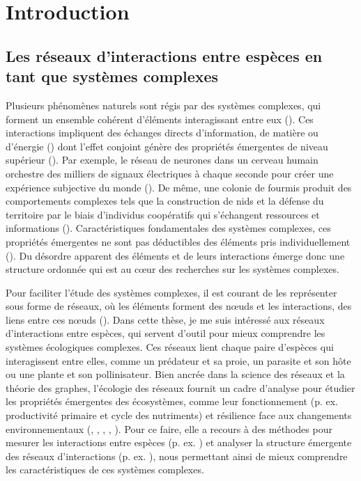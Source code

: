 
\francais   
\doublespacing
\chapter*{Introduction}



\section{Les réseaux d'interactions entre espèces en tant que systèmes complexes}

Plusieurs phénomènes naturels sont régis par des systèmes complexes, qui forment
un ensemble cohérent d'éléments interagissant entre eux
(\cite{Rind1999Complexity}). Ces interactions impliquent des échanges directs
d'information, de matière ou d'énergie (\cite{Ladyman2013What}) dont l'effet
conjoint génère des propriétés émergentes de niveau supérieur
(\cite{Foote2007Mathematics}). Par exemple, le réseau de neurones dans un
cerveau humain orchestre des milliers de signaux électriques à chaque seconde
pour créer une expérience subjective du monde (\cite{Sporns2011Human}). De même,
une colonie de fourmis produit des comportements complexes tels que la
construction de nids et la défense du territoire par le biais d'individus
coopératifs qui s'échangent ressources et informations
(\cite{Bonabeau1999Swarm}). Caractéristiques fondamentales des systèmes
complexes, ces propriétés émergentes ne sont pas déductibles des éléments pris
individuellement (\cite{Nielsen2000Emergent}). Du désordre apparent des éléments
et de leurs interactions émerge donc une structure ordonnée qui est au cœur des
recherches sur les systèmes complexes. 

Pour faciliter l'étude des systèmes complexes, il est courant de les représenter
sous forme de réseaux, où les éléments forment des nœuds et les interactions,
des liens entre ces nœuds (\cite{Newman2003Structure}). Dans cette thèse, je me
suis intéressé aux réseaux d'interactions entre espèces, qui servent d'outil
pour mieux comprendre les systèmes écologiques complexes. Ces réseaux lient
chaque paire d'espèces qui interagissent entre elles, comme un prédateur et sa
proie, un parasite et son hôte ou une plante et son pollinisateur. Bien ancrée
dans la science des réseaux et la théorie des graphes, l'écologie des réseaux
fournit un cadre d'analyse pour étudier les propriétés émergentes des
écosystèmes, comme leur fonctionnement (p. ex. productivité primaire et cycle
des nutriments) et résilience face aux changements environnementaux
(\cite{Proulx2005Network}, \cite{McCann2007Protecting}, \cite{McCann2011Food},
\cite{Rooney2012Integrating}, \cite{Valiente-Banuet2019Species}). Pour ce faire,
elle a recours à des méthodes pour mesurer les interactions entre espèces (p.
ex. \cite{Jordano2016Sampling}) et analyser la structure émergente des réseaux
d'interactions (p. ex. \cite{Delmas2019Analysing}), nous permettant ainsi de
mieux comprendre les caractéristiques de ces systèmes complexes. 

